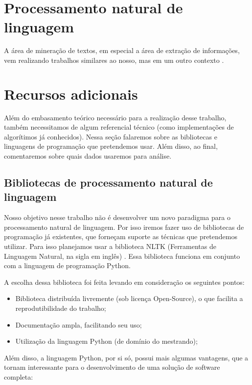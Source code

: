 \documentclass[
	12pt,				%
	openright,			%
	twoside,			%
	a4paper,			%
	english,			%
	spanish,			%
	brazil,				%
	]{abntex2}
\begin{document}
\section{Processamento natural de linguagem}
A área de mineração de textos, em especial a área de extração de informações, vem realizando trabalhos similares ao nosso, mas em um outro contexto \cite{duque2012processo, matos2010environment}.

\cite{bird2009natural}

\section{Recursos adicionais}
Além do embasamento teórico necessário para a realização desse trabalho, também necessitamos de algum referencial técnico (como implementações de algorítimos já conhecidos). Nessa seção falaremos sobre as bibliotecas e linguagens de programação que pretendemos usar. Além disso, ao final, comentaremos sobre quais dados usaremos para análise.

\subsection{Bibliotecas de processamento natural de linguagem}

Nosso objetivo nesse trabalho não é desenvolver um novo paradigma para o processamento natural de linguagem. Por isso iremos fazer uso de bibliotecas de programação já existentes, que forneçam suporte as técnicas que pretendemos utilizar. Para isso planejamos usar a biblioteca NLTK (Ferramentas de Linguagem Natural, na sigla em inglês) \cite{bird2009natural}. Essa biblioteca funciona em conjunto com a linguagem de programação Python.

A escolha dessa biblioteca foi feita levando em consideração os seguintes pontos:

\begin{itemize}
	\item Biblioteca distribuída livremente (sob licença Open-Source), o que facilita a reprodutibilidade do trabalho;
	\item Documentação ampla, facilitando seu uso;
	\item Utilização da linguagem Python (de domínio do mestrando);
\end{itemize}

Além disso, a linguagem Python, por si só, possui mais algumas vantagens, que a tornam interessante para o desenvolvimento de uma solução de software completa:
\end{document}
